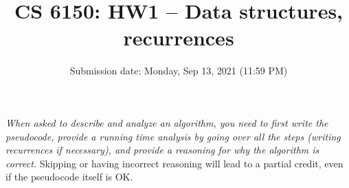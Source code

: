 \documentclass[addpoints, 11pt]{exam}
\title{CS 6150: HW1 -- Data structures, recurrences}
\date{Submission date: Monday, Sep 13, 2021 (11:59 PM)}
\begin{document}
\maketitle
\begin{center}
\end{center}

\pointname{}
\bonuspointname{}
\pointformat{[\bfseries\thepoints]}

\begin{center}
  \gradetable
\end{center}
\newpage

 \emph{When asked to describe and analyze an algorithm, you need to first write the pseudocode, provide a running time analysis by going over all the steps (writing recurrences if necessary), and provide a reasoning for why the algorithm is correct.} Skipping or having incorrect reasoning will lead to a partial credit, even if the pseudocode itself is OK.
\end{document}
